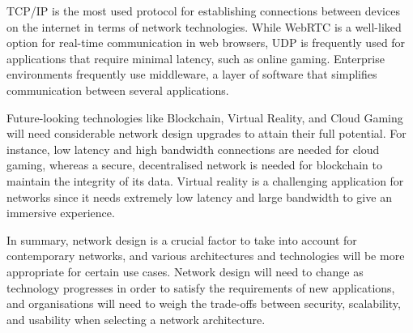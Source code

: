 TCP/IP is the most used protocol for establishing connections between devices on the internet in terms of network technologies. While WebRTC is a well-liked option for real-time communication in web browsers, UDP is frequently used for applications that require minimal latency, such as online gaming. Enterprise environments frequently use middleware, a layer of software that simplifies communication between several applications.

Future-looking technologies like Blockchain, Virtual Reality, and Cloud Gaming will need considerable network design upgrades to attain their full potential. For instance, low latency and high bandwidth connections are needed for cloud gaming, whereas a secure, decentralised network is needed for blockchain to maintain the integrity of its data. Virtual reality is a challenging application for networks since it needs extremely low latency and large bandwidth to give an immersive experience.

In summary, network design is a crucial factor to take into account for contemporary networks, and various architectures and technologies will be more appropriate for certain use cases. Network design will need to change as technology progresses in order to satisfy the requirements of new applications, and organisations will need to weigh the trade-offs between security, scalability, and usability when selecting a network architecture.
